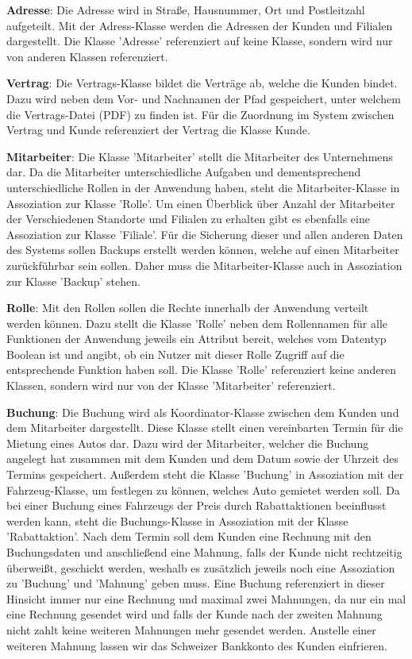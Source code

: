 \textbf{Adresse}: Die Adresse wird in Straße, Hausnummer, Ort und Postleitzahl aufgeteilt. Mit der Adress-Klasse werden die Adressen der Kunden und Filialen dargestellt. Die Klasse 'Adresse' referenziert auf keine Klasse, sondern wird nur von anderen Klassen referenziert.

\textbf{Vertrag}: Die Vertrags-Klasse bildet die Verträge ab, welche die Kunden bindet. Dazu wird neben dem Vor- und Nachnamen der Pfad gespeichert, unter welchem die Vertrags-Datei (PDF) zu finden ist. Für die Zuordnung im System zwischen Vertrag und Kunde referenziert der Vertrag die Klasse Kunde.

\textbf{Mitarbeiter}: Die Klasse 'Mitarbeiter' stellt die Mitarbeiter des Unternehmens dar. Da die Mitarbeiter unterschiedliche Aufgaben und dementsprechend unterschiedliche Rollen in der Anwendung haben, steht die Mitarbeiter-Klasse in Assoziation zur Klasse 'Rolle'. Um einen Überblick über Anzahl der Mitarbeiter der Verschiedenen Standorte und Filialen zu erhalten gibt es ebenfalls eine Assoziation zur Klasse 'Filiale'. Für die Sicherung dieser und allen anderen Daten des Systems sollen Backups erstellt werden können, welche auf einen Mitarbeiter zurückführbar sein sollen. Daher muss die Mitarbeiter-Klasse auch in Assoziation zur Klasse 'Backup' stehen.

\textbf{Rolle}: Mit den Rollen sollen die Rechte innerhalb der Anwendung verteilt werden können. Dazu stellt die Klasse 'Rolle' neben dem Rollennamen für alle Funktionen der Anwendung jeweils ein Attribut bereit, welches vom Datentyp Boolean ist und angibt, ob ein Nutzer mit dieser Rolle Zugriff auf die entsprechende Funktion haben soll. Die Klasse 'Rolle' referenziert keine anderen Klassen, sondern wird nur von der Klasse 'Mitarbeiter' referenziert.

\textbf{Buchung}: Die Buchung wird als Koordinator-Klasse zwischen dem Kunden und dem Mitarbeiter dargestellt. Diese Klasse stellt einen vereinbarten Termin für die Mietung eines Autos dar. Dazu wird der Mitarbeiter, welcher die Buchung angelegt hat zusammen mit dem Kunden und dem Datum sowie der Uhrzeit des Termins gespeichert. Außerdem steht die Klasse 'Buchung' in Assoziation mit der Fahrzeug-Klasse, um festlegen zu können, welches Auto gemietet werden soll. Da bei einer Buchung eines Fahrzeugs der Preis durch Rabattaktionen beeinflusst werden kann, steht die Buchungs-Klasse in Assoziation mit der Klasse 'Rabattaktion'. Nach dem Termin soll dem Kunden eine Rechnung mit den Buchungsdaten und anschließend eine Mahnung, falls der Kunde nicht rechtzeitig überweißt, geschickt werden, weshalb es zusätzlich jeweils noch eine Assoziation zu 'Buchung' und 'Mahnung' geben muss.
Eine Buchung referenziert in dieser Hinsicht immer nur eine Rechnung und maximal zwei Mahnungen, da nur ein mal eine Rechnung gesendet wird und falls der Kunde nach der zweiten Mahnung nicht zahlt keine weiteren Mahnungen mehr gesendet werden. Anstelle einer weiteren Mahnung lassen wir das Schweizer Bankkonto des Kunden einfrieren.

